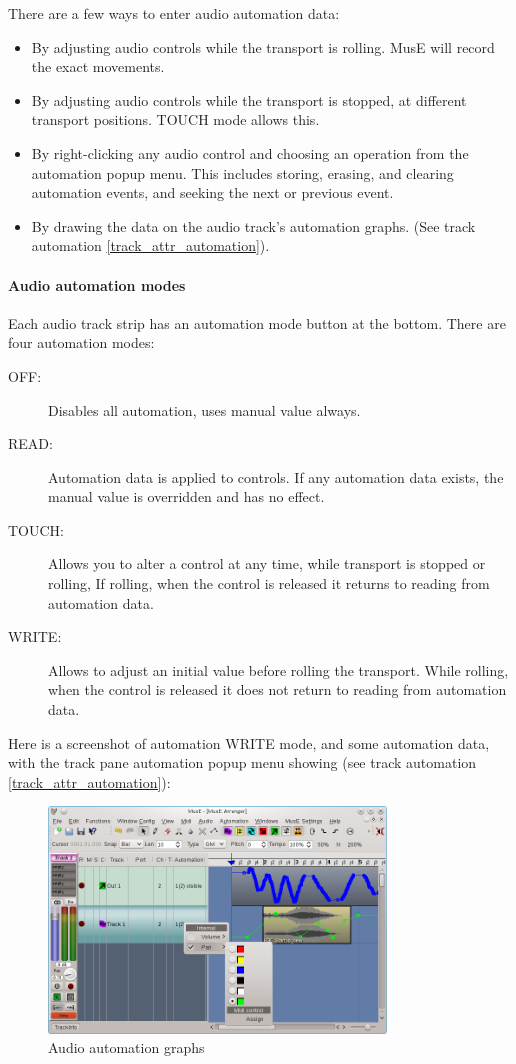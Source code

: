 \documentclass[a4paper]{report}
\newcommand{\screenshotwidth}[0]{0.8\textwidth}
\begin{document}
There are a few ways to enter audio automation data:
\begin{itemize}
\item By adjusting audio controls while the transport is rolling.
MusE will record the exact movements.
\item By adjusting audio controls while the transport is stopped,
at different transport positions. TOUCH mode allows this.
\item By right-clicking any audio control and choosing an operation
from the automation popup menu. This includes storing, erasing,
and clearing automation events, and seeking the next or previous
event.
\item By drawing the data on the audio track's automation graphs.
(See track automation \ref{track_attr_automation}).
\end{itemize}
\paragraph{Audio automation modes} 
Each audio track strip has an automation mode button
at the bottom. There are four automation modes:
\begin{description}
\item [{OFF:}] Disables all automation, uses manual value always.
\item [{READ:}] Automation data is applied to controls. If any
automation data exists, the manual value is overridden and has
no effect.
\item [{TOUCH:}] Allows you to alter a control at any time, while
transport is stopped or rolling, If rolling, when the control is
released it returns to reading from automation data. 
\item [{WRITE:}] Allows to adjust an initial value before rolling
the transport. While rolling, when the control is released it does
not return to reading from automation data. 
\end{description}
Here is a screenshot of automation WRITE mode, and some automation
data, with the track pane automation popup menu showing (see track
automation \ref{track_attr_automation}):
\begin{figure}[htp]
\centering \includegraphics[width=\screenshotwidth]
{pics/main_window_with_automation}
\caption{Audio automation graphs}
\label{fig:audio_automation} 
\end{figure}
\end{document}
